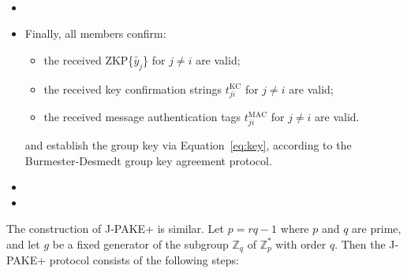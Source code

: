 \begin{itemize}
\begin{align*}
        \end{align*}
    \item[]
    \item[]  Finally, all members confirm:
    \begin{itemize}
            \item the received ZKP\{$\tilde{y_j}$\} for $j \neq i$ are valid;
            \item the received key confirmation strings $t^{\text{KC}}_{ji}$ for $j \neq i$ are valid;
            \item the received message authentication tags $t^{\text{MAC}}_{ji}$ for $j \neq i$ are valid.
        \end{itemize}
        and establish the group key via Equation~\eqref{eq:key}, according to the Burmester-Desmedt group key agreement protocol.
        \item[]
        \item[]
\end{itemize}

The construction of J-PAKE+ is similar.  Let $p = rq - 1$ where $p$ and $q$ are prime, and let $g$ be a fixed generator of the subgroup $\mathbb{Z}_q$ of $\mathbb{Z}_p^*$ with order $q$.  Then the J-PAKE+ protocol consists of the following steps:
\\

